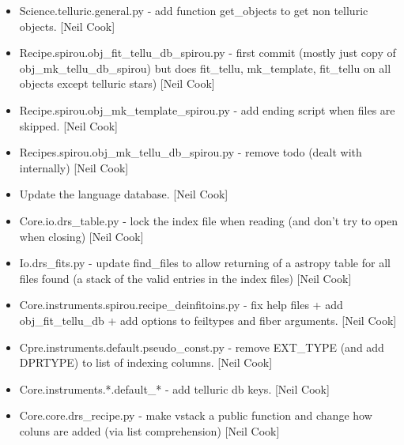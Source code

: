 \documentclass[a4paper,10pt,english]{report}
\begin{document}
\begin{itemize}
\item {} 
Science.telluric.general.py - add function get\_objects to get non
telluric objects. {[}Neil Cook{]}

\item {} 
Recipe.spirou.obj\_fit\_tellu\_db\_spirou.py - first commit (mostly just
copy of obj\_mk\_tellu\_db\_spirou) but does fit\_tellu, mk\_template,
fit\_tellu on all objects except telluric stars) {[}Neil Cook{]}

\item {} 
Recipe.spirou.obj\_mk\_template\_spirou.py - add ending script when files
are skipped. {[}Neil Cook{]}

\item {} 
Recipes.spirou.obj\_mk\_tellu\_db\_spirou.py - remove todo (dealt with
internally) {[}Neil Cook{]}

\item {} 
Update the language database. {[}Neil Cook{]}

\item {} 
Core.io.drs\_table.py - lock the index file when reading (and don’t try
to open when closing) {[}Neil Cook{]}

\item {} 
Io.drs\_fits.py - update find\_files to allow returning of a astropy
table for all files found (a stack of the valid entries in the index
files) {[}Neil Cook{]}

\item {} 
Core.instruments.spirou.recipe\_deinfitoins.py - fix help files + add
obj\_fit\_tellu\_db + add options to feiltypes and fiber arguments. {[}Neil
Cook{]}

\item {} 
Cpre.instruments.default.pseudo\_const.py - remove EXT\_TYPE (and add
DPRTYPE) to list of indexing columns. {[}Neil Cook{]}

\item {} 
Core.instruments.*.default\_* - add telluric db keys. {[}Neil Cook{]}

\item {} 
Core.core.drs\_recipe.py - make vstack a public function and change how
coluns are added (via list comprehension) {[}Neil Cook{]}

\end{itemize}
\end{document}
